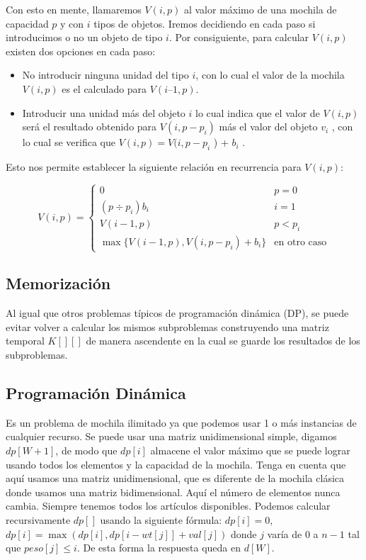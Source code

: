 Con esto en mente, llamaremos $V(i,p)$ al valor máximo de una mochila de
capacidad $p$ y con $i$ tipos de objetos. Iremos decidiendo en cada paso si
introducimos o no un objeto de tipo $i$. Por consiguiente, para calcular $V(i,p)$ existen
dos opciones en cada paso:

\begin{itemize}
	\item No introducir ninguna unidad del tipo $i$, con lo cual el valor de la mochila $V(i,p)$ es el calculado para $V(i–1,p)$.
	\item Introducir una unidad más del objeto $i$ lo cual indica que el valor de $V(i,p)$ será el resultado obtenido para $V(i,p-p_{i} )$ más el valor del objeto $v_{i}$ , con lo cual se verifica que $V(i,p) = V(i,p-p_{i}$ ) + $b_{i}$ .
\end{itemize}

Esto nos permite establecer la siguiente relación en recurrencia para $V(i,p)$:

$$V(i,p) = \begin{cases}
			0 & p=0 \\ 
			(p \div p_i)b_i & i=1 \\
			V(i-1,p) & p < p_i \\
			\max \{ V(i-1,p), V(i,p-p_i)+b_i  \} & \text{en otro caso}
\end{cases}$$

\subsection{Memorización}

Al igual que otros problemas típicos de programación dinámica (DP), se puede evitar volver a calcular los mismos subproblemas construyendo una matriz temporal $K[][]$ de manera ascendente en la cual se guarde los resultados de los subproblemas.

\subsection{Programación Dinámica}

Es un problema de mochila ilimitado ya que podemos usar 1 o más instancias de cualquier recurso. Se puede usar una matriz unidimensional simple, digamos $dp[W+1]$, de modo que $dp[i]$ almacene el valor máximo que se puede lograr usando todos los elementos y la capacidad de la mochila. Tenga en cuenta que aquí usamos una matriz unidimensional, que es diferente de la mochila clásica donde usamos una matriz bidimensional. Aquí el número de elementos nunca cambia. Siempre tenemos todos los artículos disponibles.
Podemos calcular recursivamente $dp[]$ usando la siguiente fórmula: $dp[i]=0$,
$dp[i]= \max(dp[i], dp[i-wt[j]] + val[j])$ donde $j$ varía de $0$ a $n-1$ tal que $peso[j] \le i$. De esta forma la respuesta queda en $d[W]$.

